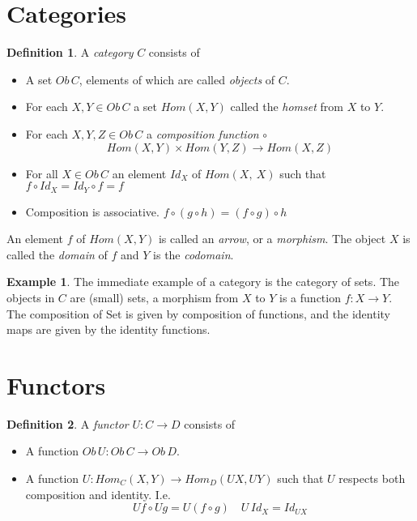 \documentclass{article}
\theoremstyle{definition}
\newtheorem{definition}{Definition}[section]
\newtheorem{example}{Example}[section]
\begin{document}
\section{Categories}

\begin{definition}
    A \textit{category} $C$ consists of
    \begin{itemize}
        \item A set $Ob\,C$, elements of which are called \textit{objects} of $C$.
        \item For each $X, Y \in Ob\,C$
            a set $Hom(X,Y)$ called the \textit{homset} from $X$ to $Y$.
        \item For each $X, Y, Z \in Ob\,C$ a \textit{composition function} $\circ$
            $$Hom(X,Y) \times Hom(Y,Z) \rightarrow Hom(X,Z)$$
        \item For all $X \in Ob\,C$ an element $Id_X$ of $Hom(X,\ X)$
            such that $f \circ Id_X = Id_Y \circ f = f$
        \item Composition is associative.  $f \circ (g \circ h) = (f \circ g) \circ h$
    \end{itemize}
\end{definition}

\par
An element $f$ of $Hom(X,Y)$ is called an \textit{arrow},
or a \textit{morphism}. The object $X$ is called the \textit{domain} of $f$ and $Y$ is
the \textit{codomain}.\\

\begin{example}
    The immediate example of a category is the category of sets.
    The objects in $C$ are (small) sets,
    a morphism from $X$ to $Y$ is a function $f : X \rightarrow Y$.
    The composition of Set is given by composition of functions,
    and the identity maps are given by the identity functions.
\end{example}

\section{Functors}
\begin{definition}
    A \textit{functor} $U : C \rightarrow D$ consists of
    \begin{itemize}
        \item A function $Ob\,U : Ob\,C \rightarrow Ob\,D$.
        \item A function $U : Hom_C(X,Y) \rightarrow Hom_D(UX, UY)$
            such that $U$ respects both composition and identity.
            I.e.
            $$Uf \circ Ug = U(f \circ g) \quad U\,Id_X = Id_{UX}$$
    \end{itemize}
\end{definition}
\end{document}

